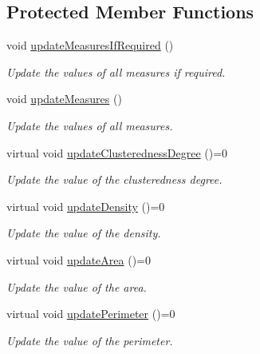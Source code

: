 \subsection*{Protected Member Functions}
\begin{DoxyCompactItemize}
\item 
void \hyperlink{classmultiscale_1_1analysis_1_1SpatialEntityPseudo3D_a151cd8c0fdfbc98cfd0adc99b9943369}{update\-Measures\-If\-Required} ()
\begin{DoxyCompactList}\small\item\em Update the values of all measures if required. \end{DoxyCompactList}\item 
void \hyperlink{classmultiscale_1_1analysis_1_1SpatialEntityPseudo3D_a24ad8b8b5768be1f917a1fb893df8c6c}{update\-Measures} ()
\begin{DoxyCompactList}\small\item\em Update the values of all measures. \end{DoxyCompactList}\item 
virtual void \hyperlink{classmultiscale_1_1analysis_1_1SpatialEntityPseudo3D_a750ba1b5e457d9d6504fc8320a76e002}{update\-Clusteredness\-Degree} ()=0
\begin{DoxyCompactList}\small\item\em Update the value of the clusteredness degree. \end{DoxyCompactList}\item 
virtual void \hyperlink{classmultiscale_1_1analysis_1_1SpatialEntityPseudo3D_a28fa63c1101f3f5ba7a0001099ee3159}{update\-Density} ()=0
\begin{DoxyCompactList}\small\item\em Update the value of the density. \end{DoxyCompactList}\item 
virtual void \hyperlink{classmultiscale_1_1analysis_1_1SpatialEntityPseudo3D_aa8c1cd3248c8926edbb1b47006ded902}{update\-Area} ()=0
\begin{DoxyCompactList}\small\item\em Update the value of the area. \end{DoxyCompactList}\item 
virtual void \hyperlink{classmultiscale_1_1analysis_1_1SpatialEntityPseudo3D_acb00990b4b812367b7ae8f16028b8c32}{update\-Perimeter} ()=0
\begin{DoxyCompactList}\small\item\em Update the value of the perimeter. \end{DoxyCompactList}\item 

\end{DoxyCompactItemize}
